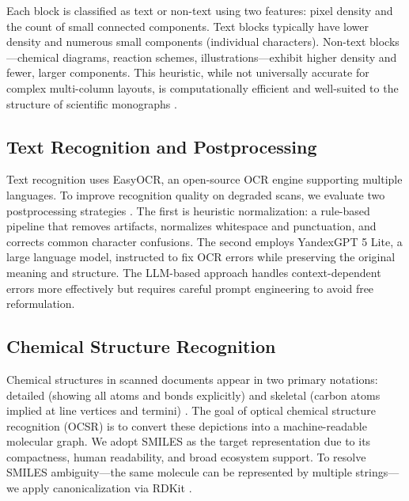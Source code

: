 \documentclass[conference]{IEEEtran}
\begin{document}
Each block is classified as text or non-text using two features: pixel density and the count of small connected components. Text blocks typically have lower density and numerous small components (individual characters). Non-text blocks---chemical diagrams, reaction schemes, illustrations---exhibit higher density and fewer, larger components. This heuristic, while not universally accurate for complex multi-column layouts, is computationally efficient and well-suited to the structure of scientific monographs \cite{refLayoutParserEn}.

\subsection{Text Recognition and Postprocessing}

Text recognition uses EasyOCR, an open-source OCR engine supporting multiple languages. To improve recognition quality on degraded scans, we evaluate two postprocessing strategies \cite{refOCRMetricsEn}. The first is heuristic normalization: a rule-based pipeline that removes artifacts, normalizes whitespace and punctuation, and corrects common character confusions. The second employs YandexGPT 5 Lite, a large language model, instructed to fix OCR errors while preserving the original meaning and structure. The LLM-based approach handles context-dependent errors more effectively but requires careful prompt engineering to avoid free reformulation.

\subsection{Chemical Structure Recognition}

Chemical structures in scanned documents appear in two primary notations: detailed (showing all atoms and bonds explicitly) and skeletal (carbon atoms implied at line vertices and termini) \cite{refLineAngleEn,refWarrEn}. The goal of optical chemical structure recognition (OCSR) is to convert these depictions into a machine-readable molecular graph. We adopt SMILES \cite{refWeininger1En} as the target representation due to its compactness, human readability, and broad ecosystem support. To resolve SMILES ambiguity---the same molecule can be represented by multiple strings---we apply canonicalization via RDKit \cite{refOBoyleCanonicalEn,refWeininger2En}.
\end{document}
